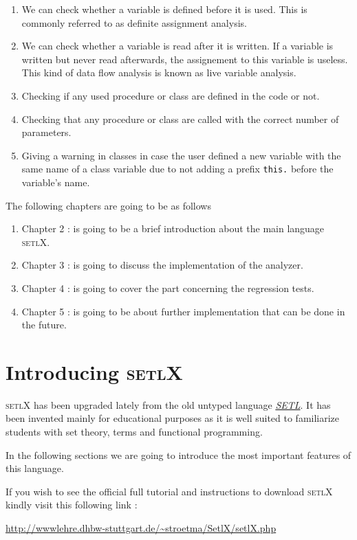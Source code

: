 \documentclass[11pt]{report}
\begin{document}
\begin{enumerate}
\item We can check whether a variable is defined before it is used.
      This is commonly referred to as definite assignment analysis.
\item We can check whether a variable is read after it is written.  If a variable is written but
      never read afterwards, the assignement to this variable is useless.  This kind of data flow
      analysis is known as live variable analysis.
\item Checking if any used procedure or class are defined in the code or not.
\item Checking that any procedure or class are called with the correct number of parameters.
\item Giving a warning in classes in case the user defined a new variable with the same name of a class variable due to not adding a prefix \texttt{this.} before the variable's name.
\end{enumerate}

The following chapters are going to be as follows
\begin{enumerate}
\item Chapter 2 : is going to be a brief introduction about the main language \textsc{setlX}.
\item Chapter 3 : is going to discuss the implementation of the analyzer.
\item Chapter 4 : is going to cover the part concerning the regression tests.
\item Chapter 5 : is going to be about further implementation that can be done in the future.
\end{enumerate}

\chapter{Introducing \textsc{setlX}}

\textsc{setlX} has been upgraded lately from the old untyped language \href{http://en.wikipedia.org/wiki/SETL}{\emph{SETL}}. It has been invented mainly for educational purposes as it is well suited to familiarize students with set theory, terms and functional programming.

In the following sections we are going to introduce the most important features of this language.

\begin{center} If you wish to see the official full tutorial and instructions to download \textsc{setlX} kindly visit this following link : 

\url{http://wwwlehre.dhbw-stuttgart.de/~stroetma/SetlX/setlX.php} \end{center}
\end{document}

